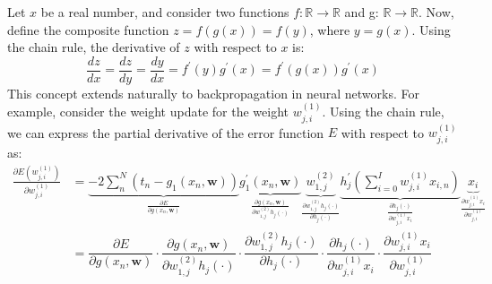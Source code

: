 Let $x$ be a real number, and consider two functions $f: \mathbb{R} \rightarrow \mathbb{R}$ and g: $\mathbb{R} \rightarrow \mathbb{R}$.
Now, define the composite function $z = f(g(x)) = f(y)$, where $y = g(x)$.
Using the chain rule, the derivative of $z$ with respect to $x$ is:
\[\dfrac{dz}{dx}=\dfrac{dz}{dy}=\dfrac{dy}{dx}=f^\prime(y)g^\prime(x)=f^\prime(g(x))g^\prime(x)\]
This concept extends naturally to backpropagation in neural networks. 
For example, consider the weight update for the weight $w_{j,i}^{(1)}$.
Using the chain rule, we can express the partial derivative of the error function $E$ with respect to $w_{j,i}^{(1)}$ as:
\begin{align*}
    \frac{\partial E(w_{j,i}^{(1)})}{\partial w_{j,i}^{(1)}}    &=\underbrace{-2\sum_n^N(t_n-g_1(x_n,\mathbf{w}))}_{\frac{\partial E}{\partial g(x_n,\mathbf{w})}}\underbrace{g_1^\prime(x_n,\mathbf{w})}_{\frac{\partial g(x_n,\mathbf{w})}{\partial w_{1,j}^{(2)}h_j(\cdot)}}\underbrace{w_{1,j}^{(2)}}_{\frac{\partial w_{1,j}^{(2)}h_j(\cdot)}{\partial h_j(\cdot)}}\underbrace{h^\prime_j\left(\sum_{i=0}^Iw_{j,i}^{(1)}x_{i,n}\right)}_{\frac{\partial h_j(\cdot)}{\partial w_{j,i}^{(1)}x_i}}\underbrace{x_i}_{\frac{\partial w_{j,i}^{(1)}x_i}{\partial w_{j,i}^{(1)}}} \\
                                                                &=\dfrac{\partial E}{\partial g(x_n,\mathbf{w})}\cdot\dfrac{\partial g(x_n,\mathbf{w})}{\partial w_{1,j}^{(2)}h_j(\cdot)}\cdot\dfrac{\partial w_{1,j}^{(2)}h_j(\cdot)}{\partial h_j(\cdot)}\cdot\dfrac{\partial h_j(\cdot)}{\partial w_{j,i}^{(1)}x_i}\cdot\dfrac{\partial w_{j,i}^{(1)}x_i}{\partial w_{j,i}^{(1)}}
\end{align*}

